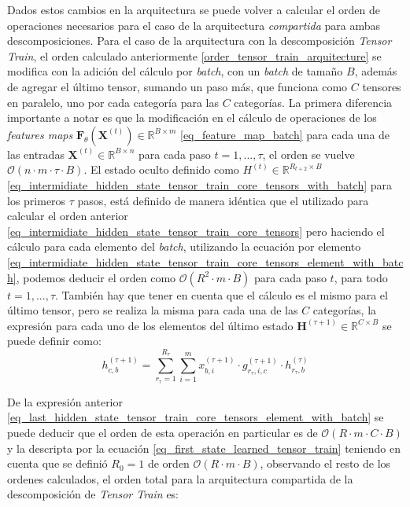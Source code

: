 \documentclass[spanish]{article}
\theoremstyle{definition}
\theoremstyle{remark}
\numberwithin{equation}{section}
\numberwithin{equation}{section} %
\begin{document}
Dados estos cambios en la arquitectura se puede volver a calcular el orden de operaciones necesarios para el caso de la arquitectura \textit{compartida} para ambas descomposiciones. Para el caso de la arquitectura con la descomposición \textit{Tensor Train}, el orden calculado anteriormente \eqref{order_tensor_train_arquitecture} se modifica con la adición del cálculo por \textit{batch}, con un \textit{batch} de tamaño $B$, además de agregar el último tensor, sumando un paso más, que funciona como $C$ tensores en paralelo, uno por cada categoría para las $C$ categorías. La primera diferencia importante a notar es que la modificación en el cálculo de operaciones de los \textit{features maps} $\boldsymbol{F}_\theta(\boldsymbol{X}^{(t)}) \in \mathbb{R}^{B \times m}$ \eqref{eq_feature_map_batch} para cada una de las entradas $\boldsymbol{X}^{(t)} \in \mathbb{R}^{B \times n}$ para cada paso $t=1,...,\tau$, el orden se vuelve $\mathcal{O}(n \cdot m \cdot \tau \cdot B )$. El estado oculto definido como $H^{(t)} \in \mathbb{R}^{R_{t+2} \times B}$ \eqref{eq_intermidiate_hidden_state_tensor_train_core_tensors_with_batch} para los primeros $\tau$ pasos, está definido de manera idéntica que el utilizado para calcular el orden anterior  \eqref{eq_intermidiate_hidden_state_tensor_train_core_tensors} pero haciendo el cálculo para cada elemento del \textit{batch}, utilizando la ecuación por elemento \eqref{eq_intermidiate_hidden_state_tensor_train_core_tensors_element_with_batch}, podemos deducir el orden como $\mathcal{O}(R^{2} \cdot m \cdot B)$ para cada paso $t$, para todo $t=1,...,\tau$. También hay que tener en cuenta que el cálculo es el mismo para el último tensor, pero se realiza la misma para cada una de las $C$ categorías, la expresión para cada uno de los elementos del último estado $\boldsymbol{H}^{(\tau+1)} \in \mathbb{R}^{C \times B}$ se puede definir como: 
\begin{equation}
\label{eq_last_hidden_state_tensor_train_core_tensors_element_with_batch}
h^{(\tau +1)}_{c,b}  
= \sum^{R_{\tau}}_{r_{\tau}=1} \sum_{i=1}^m  x^{(\tau+1)}_{b,i} \cdot g^{(\tau+1)}_{r_{\tau},i,c} \cdot  {h}^{(\tau)}_{r_{\tau},b} 
\end{equation} \par
De la expresión anterior \eqref{eq_last_hidden_state_tensor_train_core_tensors_element_with_batch} se puede deducir que el orden de esta operación en particular es de $\mathcal{O}(R \cdot m \cdot C \cdot B)$ y la descripta por la ecuación \eqref{eq_first_state_learned_tensor_train} teniendo en cuenta que se definió $R_0=1$ de orden $\mathcal{O}(R \cdot m \cdot B)$, observando el resto de los ordenes calculados, el orden total para la arquitectura compartida de la descomposición de \textit{Tensor Train} es:
\end{document}

